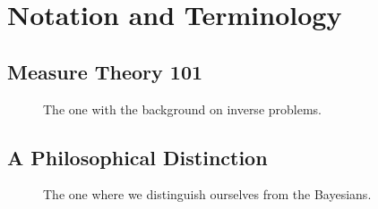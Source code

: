 % 


\section{Notation and Terminology}


\subsection{Measure Theory 101}

\begin{frame}[t]
\centering
\begin{figure}
\centering

The one with the background on inverse problems.

\end{figure}

\end{frame}




\subsection{A Philosophical Distinction}

\begin{frame}[t]
\centering
\begin{figure}
\centering

The one where we distinguish ourselves from the Bayesians.

\end{figure}

\end{frame}


